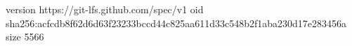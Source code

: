 version https://git-lfs.github.com/spec/v1
oid sha256:acfcdb8f62d6d63f23233bccd44c825aa611d33c548b2f1aba230d17e283456a
size 5566
